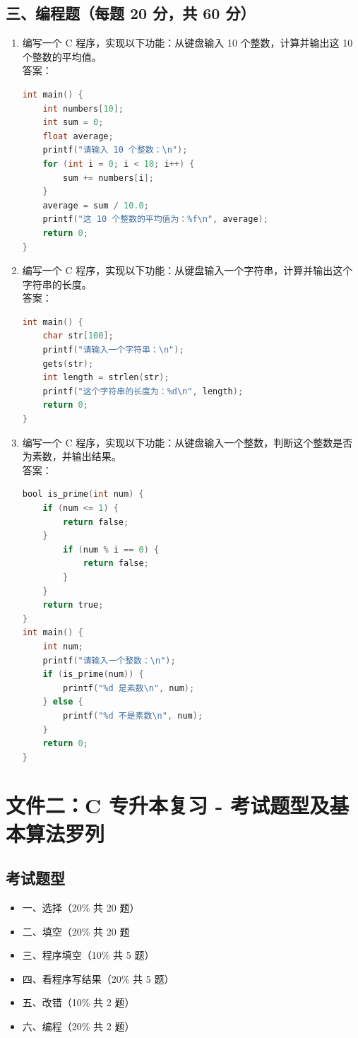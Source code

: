 \documentclass[a4paper,12pt]{article}
\begin{document}
\subsection{三、编程题（每题 20 分，共 60 分）}

\begin{enumerate}
    \item 编写一个 C 程序，实现以下功能：从键盘输入 10 个整数，计算并输出这 10 个整数的平均值。\\
    答案：
    \begin{lstlisting}[language=C]
int main() {
    int numbers[10];
    int sum = 0;
    float average;
    printf("请输入 10 个整数：\n");
    for (int i = 0; i < 10; i++) {
        sum += numbers[i];
    }
    average = sum / 10.0;
    printf("这 10 个整数的平均值为：%f\n", average);
    return 0;
}
    \end{lstlisting}

    \item 编写一个 C 程序，实现以下功能：从键盘输入一个字符串，计算并输出这个字符串的长度。\\
    答案：
    \begin{lstlisting}[language=C]
int main() {
    char str[100];
    printf("请输入一个字符串：\n");
    gets(str);
    int length = strlen(str);
    printf("这个字符串的长度为：%d\n", length);
    return 0;
}
    \end{lstlisting}

    \item 编写一个 C 程序，实现以下功能：从键盘输入一个整数，判断这个整数是否为素数，并输出结果。\\
    答案：
    \begin{lstlisting}[language=C]
bool is_prime(int num) {
    if (num <= 1) {
        return false;
    }
        if (num % i == 0) {
            return false;
        }
    }
    return true;
}
int main() {
    int num;
    printf("请输入一个整数：\n");
    if (is_prime(num)) {
        printf("%d 是素数\n", num);
    } else {
        printf("%d 不是素数\n", num);
    }
    return 0;
}
    \end{lstlisting}
\end{enumerate}

\section{文件二：C 专升本复习 - 考试题型及基本算法罗列}

\subsection{考试题型}
\begin{itemize}
    \item 一、选择（20\% 共 20 题）
    \item 二、填空（20\% 共 20 题
    \item 三、程序填空（10\% 共 5 题）
    \item 四、看程序写结果（20\% 共 5 题）
    \item 五、改错（10\% 共 2 题）
    \item 六、编程（20\% 共 2 题）
\end{itemize}
\end{document}
